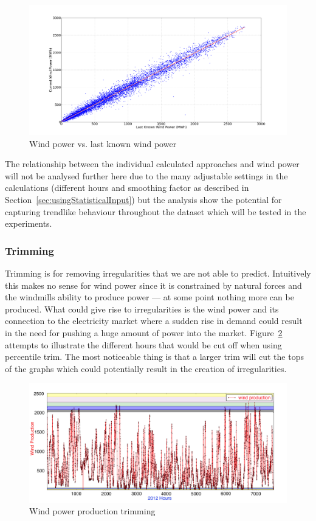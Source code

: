 \begin{figure}[H]
\centering
\includegraphics[width=0.95\linewidth]{billeder/windProductionVsLastWindProduction.png}
\caption{Wind power vs. last known wind power}
\label{fig:windProductionVsLastWindProduction}
\end{figure}

\noindent The relationship between the individual calculated approaches and wind power will not be analysed further here due to the many adjustable settings in the calculations (different hours and smoothing factor as described in Section~\ref{sec:usingStatisticalInput}) but the analysis show the potential for capturing trendlike behaviour throughout the dataset which will be tested in the experiments.

\subsubsection{Trimming} 
Trimming is for removing irregularities that we are not able to predict. Intuitively this makes no sense for wind power since it is constrained by natural forces and the windmills ability to produce power --- at some point nothing more can be produced. What could give rise to irregularities is the wind power and its connection to the electricity market where a sudden rise in demand could result in the need for pushing a huge amount of power into the market. Figure~\ref{fig:windProductionTrimming} attempts to illustrate the different hours that would be cut off when using percentile trim. The most noticeable thing is that a larger trim will cut the tops of the graphs which could potentially result in the creation of irregularities. 

\begin{figure}[H]
\centering
\includegraphics[width=0.99\linewidth]{billeder/windProductionTrimming.jpg}
\caption{Wind power production trimming}
\label{fig:windProductionTrimming}
\end{figure}

